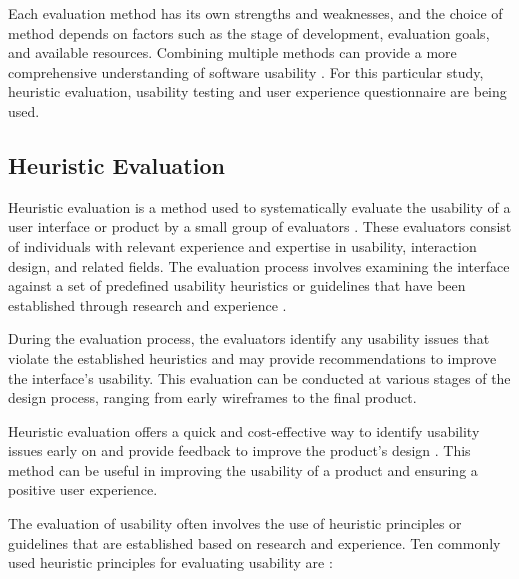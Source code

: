 \documentclass[conference,onecolumn]{IEEEtran}
\begin{document}
    Each evaluation method has its own strengths and weaknesses, and the choice of method depends on factors such as the stage of development, evaluation goals, and available resources. Combining multiple methods can provide a more comprehensive understanding of software usability \cite{hartson2012ux}. For this particular study, heuristic evaluation, usability testing and user experience questionnaire are being used.

	\subsection{Heuristic Evaluation}
        Heuristic evaluation is a method used to systematically evaluate the usability of a user interface or product by a small group of evaluators \cite{nielsen1994heuristic}. These evaluators consist of individuals with relevant experience and expertise in usability, interaction design, and related fields. The evaluation process involves examining the interface against a set of predefined usability heuristics or guidelines that have been established through research and experience \cite{nielsen1994heuristic}.

        During the evaluation process, the evaluators identify any usability issues that violate the established heuristics and may provide recommendations to improve the interface's usability. This evaluation can be conducted at various stages of the design process, ranging from early wireframes to the final product.
        
        Heuristic evaluation offers a quick and cost-effective way to identify usability issues early on and provide feedback to improve the product's design \cite{molich1990improving}. This method can be useful in improving the usability of a product and ensuring a positive user experience.
        
        The evaluation of usability often involves the use of heuristic principles or guidelines that are established based on research and experience. Ten commonly used heuristic principles for evaluating usability are \cite{nielsen2005ten}:
\end{document}
